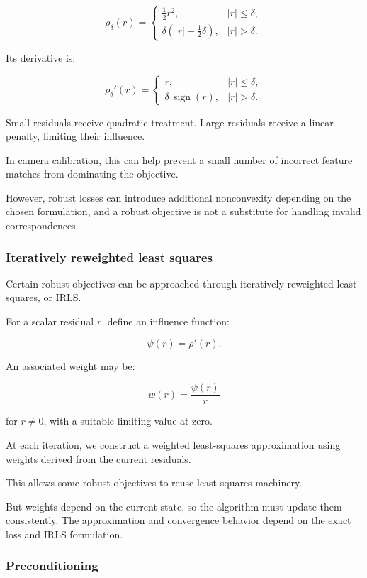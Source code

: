 \[
\rho_\delta(r)= \begin{cases} \frac12r^2,&|r|\le\delta,\\ \delta(|r|-\frac12\delta),&|r|>\delta. \end{cases}
\]

Its derivative is:

\[
\rho_\delta'(r)= \begin{cases} r,&|r|\le\delta,\\ \delta\,\operatorname{sign}(r),&|r|>\delta. \end{cases}
\]

Small residuals receive quadratic treatment. Large residuals receive a linear penalty, limiting their influence.

In camera calibration, this can help prevent a small number of incorrect feature matches from dominating the objective.

However, robust losses can introduce additional nonconvexity depending on the chosen formulation, and a robust objective is not a substitute for handling invalid correspondences.

\subsubsection{Iteratively reweighted least squares}\label{02-foundations-ii-ch028-iteratively-reweighted-least-squares}

Certain robust objectives can be approached through iteratively reweighted least squares, or IRLS.

For a scalar residual \(r\), define an influence function:

\[
\psi(r)=\rho'(r).
\]

An associated weight may be:

\[
w(r)=\frac{\psi(r)}r
\]

for \(r\ne0\), with a suitable limiting value at zero.

At each iteration, we construct a weighted least-squares approximation using weights derived from the current residuals.

This allows some robust objectives to reuse least-squares machinery.

But weights depend on the current state, so the algorithm must update them consistently. The approximation and convergence behavior depend on the exact loss and IRLS formulation.

\subsubsection{Preconditioning}\label{02-foundations-ii-ch028-preconditioning}

